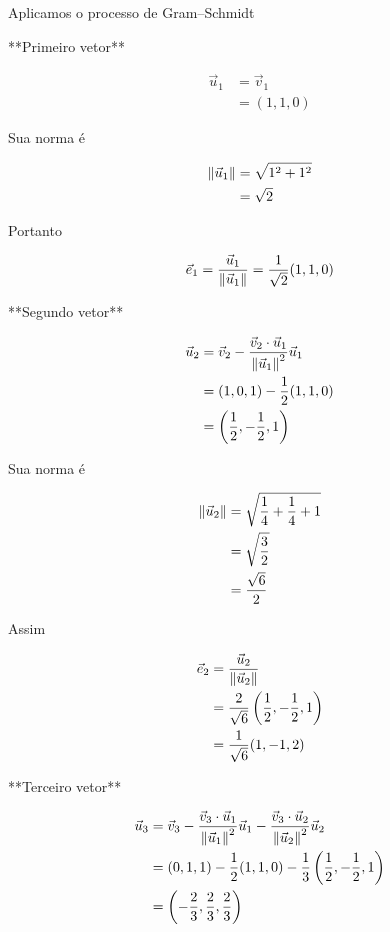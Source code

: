 \documentclass[a4paper,12pt,fleqn]{article}
\begin{document}
\begin{answer}
  Aplicamos o processo de Gram--Schmidt

  **Primeiro vetor**

  \begin{align*}
    \vec{u}_1
    & = \vec{v}_1
    \\
    & = (1,1,0)
  \end{align*}

  Sua norma é

  \begin{align*}
    \norm{\vec{u}_1}
    & = \sqrt{1^2+1^2}
    \\
    & = \sqrt{2}
  \end{align*}

  Portanto

  \[
    \vec{e}_1
    = \frac{\vec{u}_1}{\norm{\vec{u}_1}}
    = \frac{1}{\sqrt{2}}(1,1,0)
  \]

  **Segundo vetor**

  \begin{align*}
    \vec{u}_2
    & = \vec{v}_2
      -\frac{\vec{v}_2\cdot\vec{u}_1}
             {\norm{\vec{u}_1}^2}\vec{u}_1
    \\
    & = (1,0,1)
      -\frac{1}{2}(1,1,0)
    \\
    & = \left(\frac{1}{2},-\frac{1}{2},1\right)
  \end{align*}

  Sua norma é

  \begin{align*}
    \norm{\vec{u}_2}
    & = \sqrt{\frac{1}{4}+\frac{1}{4}+1}
    \\
    & = \sqrt{\frac{3}{2}}
    \\
    & = \frac{\sqrt{6}}{2}
  \end{align*}

  Assim

  \begin{align*}
    \vec{e}_2
    & = \frac{\vec{u}_2}{\norm{\vec{u}_2}}
    \\
    & = \frac{2}{\sqrt{6}}
      \left(\frac{1}{2},-\frac{1}{2},1\right)
    \\
    & = \frac{1}{\sqrt{6}}(1,-1,2)
  \end{align*}

  **Terceiro vetor**

  \begin{align*}
    \vec{u}_3
    & = \vec{v}_3
      -\frac{\vec{v}_3\cdot\vec{u}_1}
             {\norm{\vec{u}_1}^2}\vec{u}_1
      -\frac{\vec{v}_3\cdot\vec{u}_2}
             {\norm{\vec{u}_2}^2}\vec{u}_2
    \\
    & = (0,1,1)
      -\frac{1}{2}(1,1,0)
      -\frac{1}{3}
       \left(\frac{1}{2},-\frac{1}{2},1\right)
    \\
    & = \left(-\frac{2}{3},\frac{2}{3},\frac{2}{3}\right)
  \end{align*}


\end{answer}
\end{document}
